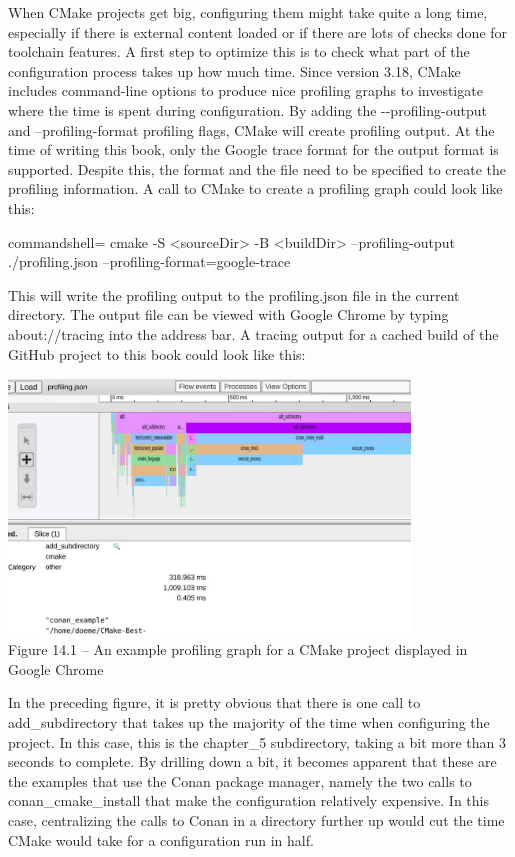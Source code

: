 When CMake projects get big, configuring them might take quite a long time, especially if there is external content loaded or if there are lots of checks done for toolchain features. A first step to optimize this is to check what part of the configuration process takes up how much time. Since version 3.18, CMake includes command-line options to produce nice profiling graphs to investigate where the time is spent during configuration. By adding the -{}-profiling-output and --profiling-format profiling flags, CMake will create profiling output. At the time of writing this book, only the Google trace format for the output format is supported. Despite this, the format and the file need to be specified to create the profiling information. A call to CMake to create a profiling graph could look like this:

\begin{tcblisting}{commandshell={}}
cmake -S <sourceDir> -B <buildDir> --profiling-output
./profiling.json --profiling-format=google-trace
\end{tcblisting}

This will write the profiling output to the profiling.json file in the current directory. The output file can be viewed with Google Chrome by typing about://tracing into the address bar. A tracing output for a cached build of the GitHub project to this book could look like this:

\begin{center}
\includegraphics[width=0.8\textwidth]{content/3/chapter14/images/1.jpg}\\
Figure 14.1 – An example profiling graph for a CMake project displayed in Google Chrome
\end{center}

In the preceding figure, it is pretty obvious that there is one call to add\_subdirectory that takes up the majority of the time when configuring the project. In this case, this is the chapter\_5 subdirectory, taking a bit more than 3 seconds to complete. By drilling down a bit, it becomes apparent that these are the examples that use the Conan package manager, namely the two calls to conan\_cmake\_install that make the configuration relatively expensive. In this case, centralizing the calls to Conan in a directory further up would cut the time CMake would take for a configuration run in half.

